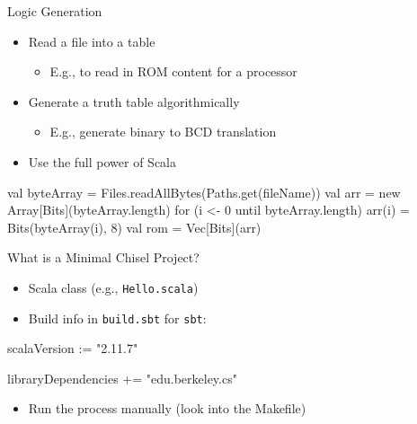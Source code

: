 \documentclass[xcolor=pdflatex,dvipsnames,table]{beamer}
\newcommand{\code}[1]{{\texttt{#1}}}
\begin{document}
\begin{frame}[fragile]{Logic Generation}
\begin{itemize}
\item Read a file into a table
\begin{itemize}
\item E.g., to read in ROM content for a processor
\end{itemize}
\item Generate a truth table algorithmically
\begin{itemize}
\item E.g., generate binary to BCD translation
\end{itemize}
\item Use the full power of Scala
\end{itemize}
\begin{chisel}
val byteArray = Files.readAllBytes(Paths.get(fileName))
val arr = new Array[Bits](byteArray.length)
for (i <- 0 until byteArray.length) {
  arr(i) = Bits(byteArray(i), 8)
}
val rom = Vec[Bits](arr)
\end{chisel}
\end{frame}
%

\begin{frame}[fragile]{What is a Minimal Chisel Project?}
\begin{itemize}
\item Scala class (e.g., \code{Hello.scala})
\item Build info in \code{build.sbt} for \code{sbt}:
\end{itemize}
\begin{chisel}
scalaVersion := "2.11.7"

libraryDependencies += "edu.berkeley.cs" %
\end{chisel}
\begin{itemize}
\item Run the process manually (look into the Makefile)
\end{itemize}
\end{frame}
\end{document}
